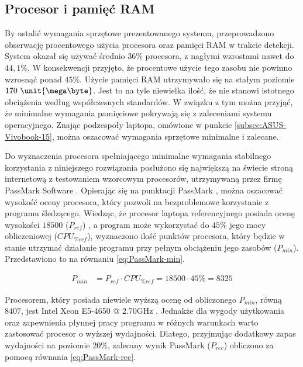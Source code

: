 \documentclass[a4paper,twoside,12pt]{book}
\begin{document}
\subsection{Procesor i pamięć RAM}
\label{subsec:Procesor-i-pamięć-RAM}

By ustalić wymagania sprzętowe prezentowanego systemu, przeprowadzono obserwację procentowego użycia procesora oraz pamięci RAM w trakcie detekcji. System okazał się używać średnio $36\%$ procesora, z nagłymi wzrostami nawet do $44,1\%$, W konsekwencji przyjęto, że procentowe użycie tego zasobu nie powinno wzrosnąć ponad $45\%$. Użycie pamięci RAM utrzymywało się na stałym poziomie $170 \ \unit{\mega\byte}$. Jest to na tyle niewielka ilość, że nie stanowi istotnego obciążenia według współczesnych standardów. W związku z tym można przyjąć, że minimalne wymagania pamięciowe pokrywają się z zaleceniami systemu operacyjnego. Znając podzespoły laptopa, omówione w punkcie \ref{subsec:ASUS-Vivobook-15}, można oszacować wymagania sprzętowe minimalne i zalecane.

Do wyznaczenia procesora spełniającego minimalne wymagania stabilnego korzystania z niniejszego rozwiązania posłużono się największą na świecie stroną internetową z testowaniem wzorcowym procesorów, utrzymywaną przez firmę PassMark Software \cite{bib:PassMark-about-us}. Opierając się na punktacji PassMark \cite{bib:PassMark-test}, można oszacować wysokość oceny procesora, który pozwoli na bezproblemowe korzystanie z programu śledzącego. Wiedząc, że procesor laptopa referencyjnego posiada ocenę wysokości $18500$ ($P_{ref}$) \cite{bib:moj-procesor-benchmark}, a program może wykorzystać do $45\%$ jego mocy obliczeniowej ($CPU_{\%ref}$), wyznaczono ilość punktów procesora, który będzie w stanie utrzymać działanie programu przy pełnym obciążeniu jego zasobów ($P_{min}$). Przedstawiono to na równaniu \ref{eq:PassMark-min}.

\begin{align}
	P_{min} &= P_{ref} \cdot CPU_{\%ref} = 18500 \cdot 45\% = 8325
	\label{eq:PassMark-min}
\end{align}

Procesorem, który posiada niewiele wyższą ocenę od obliczonego $P_{min}$, równą $8407$, jest Intel Xeon E5-4650 @ 2.70GHz \cite{bib:min-procesor-benchmark}. Jednakże dla wygody użytkowania oraz zapewnienia płynnej pracy programu w różnych warunkach warto zastosować procesor o wyższej wydajności. Dlatego, przyjmując dodatkowy zapas wydajności na poziomie $20\%$, zalecany wynik PassMark ($P_{rec}$) obliczono za pomocą równania \ref{eq:PassMark-rec}.
\end{document}
